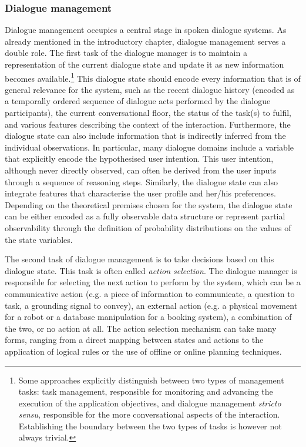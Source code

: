 \subsubsection*{Dialogue management}

Dialogue management occupies a central stage in spoken dialogue systems.  As already mentioned in the introductory chapter, dialogue management serves a double role.  The first task of the dialogue manager is to maintain a representation of the current dialogue state and update it as new information becomes available.\footnote{Some approaches explicitly distinguish between two types of management tasks: task management, responsible for monitoring and advancing the execution of the application objectives, and dialogue management \textit{stricto sensu}, responsible for the more conversational aspects of the interaction. Establishing the boundary between the two types of tasks is however not always trivial.} This dialogue state should encode every information that is of general relevance for the system, such as the recent dialogue history (encoded as a temporally ordered sequence of dialogue acts performed by the dialogue participants), the current conversational floor, the status of the task(s) to fulfil, and various features describing the context of the interaction.  Furthermore, the dialogue state can also include information that is indirectly inferred from the individual observations. In particular, many dialogue domains include a variable that explicitly encode the hypothesised user intention.  This user intention, although never directly observed, can often be derived from the user inputs through a sequence of reasoning steps.  Similarly, the dialogue state can also integrate features that characterise the user profile and her/his preferences. Depending on the theoretical premises chosen for the system, the dialogue state can be either encoded as a fully observable data structure or represent partial observability through the definition of probability distributions on the values of the state variables. 

The second task of dialogue management is to take decisions based on this dialogue state.  This task is often called \textit{action selection}.  The dialogue manager is responsible for selecting the next action to perform by the system, which can be a communicative action (e.g. a piece of information to communicate, a question to task, a grounding signal to convey), an external action (e.g. a physical movement for a robot or a database manipulation for a booking system), a combination of the two, or no action at all.  The action selection mechanism can take many forms, ranging from a direct mapping between states and actions to the application of logical rules or the use of offline or online planning techniques. 

